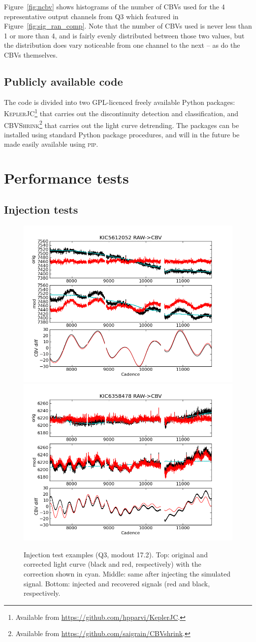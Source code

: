 \documentclass[useAMS,usenatbib]{mn2e}
\begin{document}
Figure~\ref{fig:ncbv} shows histograms of the number of CBVs used for the 4 representative output channels from Q3 which featured in Figure~\ref{fig:sig_ran_comp}. Note that the number of CBVs used is never less than 1 or more than 4, and is fairly evenly distributed between those two values, but the distribution does vary noticeable from one channel to the next -- as do the CBVs themselves.

\subsection{Publicly available code}
The code is divided into two GPL-licenced freely available Python packages: \textsc{KeplerJC}\footnote{Available from \url{https://github.com/hpparvi/KeplerJC}.} that carries out the discontinuity detection and classification, and \textsc{CBVShrink}\footnote{Available from \url{https://github.com/saigrain/CBVshrink}.} that carries out the light curve detrending. The packages can be installed using standard Python package procedures, and will in the future be made easily available using \textsc{pip}.


\section{Performance tests}
\label{sec:tests}

\subsection{Injection tests}
\label{sec:inject}

\begin{figure}
  \centering
  \includegraphics[width=0.48\linewidth]{inject_ex1.png} \hfill
  \includegraphics[width=0.48\linewidth]{inject_ex2.png}
  \caption{Injection test examples (Q3, modout 17.2). Top: original
    and corrected light curve (black and red, respectively) with the correction
    shown in cyan. Middle: same after injecting the simulated
    signal. Bottom: injected and recovered signals (red and black, respectively.}
  \label{fig:inject_ex}
\end{figure}
\end{document}
